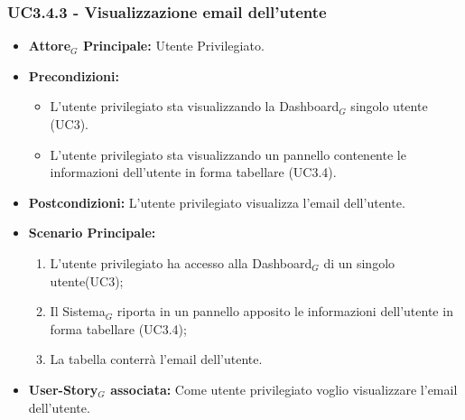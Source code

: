\documentclass[10pt]{article}
\begin{document}
\begin{justify}
\subsubsection{\textbf{UC3.4.3 - Visualizzazione email dell'utente}}
\label{UC3.4.3}
\begin{itemize}
     \item \textbf{Attore$_G$ Principale:} Utente Privilegiato.
     \item \textbf{Precondizioni:}
        \begin{itemize}
    	\item L'utente privilegiato sta visualizzando la Dashboard$_G$ singolo utente (UC3).
          \item L'utente privilegiato sta visualizzando un pannello contenente le informazioni dell'utente in forma tabellare (UC3.4).
        \end{itemize}
      \item \textbf{Postcondizioni:} L'utente privilegiato visualizza l'email dell'utente.
      \item \textbf{Scenario Principale:}
        \begin{enumerate}
            \item L'utente privilegiato ha accesso alla Dashboard$_G$ di un singolo utente(UC3);
            \item Il Sistema$_G$ riporta  in un pannello apposito le informazioni dell'utente in forma tabellare (UC3.4);
            \item La tabella conterrà l'email dell'utente.
        \end{enumerate}
     \item \textbf{User-Story$_G$ associata:}
       Come utente privilegiato voglio visualizzare l'email dell'utente.
\end{itemize}


\end{justify}
\end{document}
